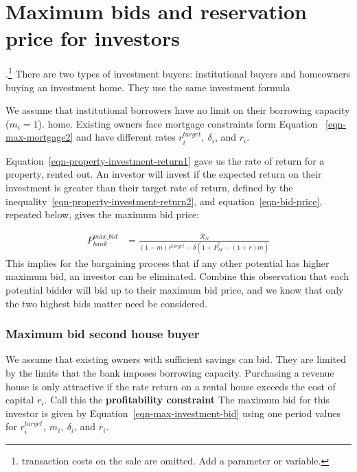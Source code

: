 \section{Maximum bids and reservation price for investors }.\footnote{transaction costs on the sale are omitted. Add a parameter or variable.}
There are two types of investment buyers: institutional buyers and homeowners buying an investment home. They use the same investment formula

We assume that institutional borrowers have no limit on their borrowing capacity ($m_i=1$). home. Existing owners face mortgage constraints form Equation ~\ref{eqn-max-mortgage2} and have different rates $r_i^{target},\ \delta_i$, and $r_i$.

Equation~\ref{eqn-property-investment-return1} gave us the rate of return for a property, rented out. An investor will invest if the expected return on their investment is greater than their target rate of return, %
defined by the inequality~\ref{eqn-property-investment-return2}, and equation~\ref{eqn-bid-price}, repeated below, gives the maximum bid price:

\begin{eqnarray}\label{eqn-max-investment-bid}
P_{bank}^{max\_bid} & = \frac{\mathcal{R}_N}{(1-m)r^{target}-\delta \left(1 + \dot P_M^e - (1+r)m\right)} 
\end{eqnarray}
This implies for the bargaining process that if any other potential  has  higher maximum bid, an investor can be eliminated. Combine this observation that each potential bidder will bid up to their maximum bid price, and we know that only the two highest bids matter need be considered.  



\subsubsection{Maximum bid second house buyer}

We assume that existing owners with sufficient savings can bid. They are limited by the limits  that the bank imposes  borrowing capacity.   Purchasing a revenue house is only attractive if the rate return on a rental house exceeds the cost of capital $r_i$. Call this the \textbf{profitability constraint} The maximum bid for this investor is given by Equation~\ref{eqn-max-investment-bid} using one period values for $r_i^{target},\ m_i,\ \delta_i$, and $r_i$.

